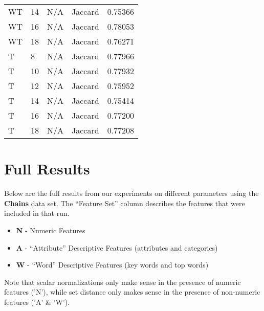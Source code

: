\documentclass{article}
\begin{document}
\begin{center}
\begin{supertabular}{| l | l | l | l | l |}
               WT & 14 & N/A & Jaccard & 0.75366 \\
               WT & 16 & N/A & Jaccard & 0.78053 \\
               WT & 18 & N/A & Jaccard & 0.76271 \\
               T & 8 & N/A & Jaccard & 0.77966 \\
               T & 10 & N/A & Jaccard & 0.77932 \\
               T & 12 & N/A & Jaccard & 0.75952 \\
               T & 14 & N/A & Jaccard & 0.75414 \\
               T & 16 & N/A & Jaccard & 0.77200 \\
               T & 18 & N/A & Jaccard & 0.77208 \\
         \end{supertabular}
   \end{center}

\section{Full Results}
\label{appendix:full-results}
   Below are the full results from our experiments on different parameters using the \textbf{Chains} data set.
   The ``Feature Set'' column describes the features that were included in that run.
   \begin{itemize}
      \item \textbf{N} - Numeric Features
      \item \textbf{A} - ``Attribute'' Descriptive Features (attributes and categories)
      \item \textbf{W} - ``Word'' Descriptive Features (key words and top words)
   \end{itemize}

   Note that scalar normalizations only make sense in the presence of numeric features ('N'),
   while set distance only makes sense in the presence of non-numeric features ('A' \& 'W').
\end{document}
